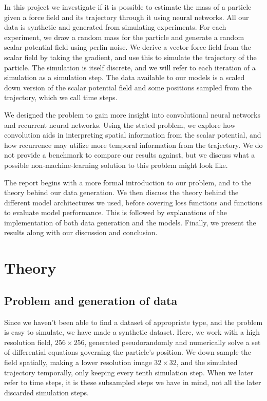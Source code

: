 \documentclass[a4paper]{article}
\begin{document}
In this project we investigate if it is possible to estimate the mass of a particle given a force field and its trajectory through it using neural networks.  All our data is synthetic and generated from simulating experiments.  For each experiment, we draw a random mass for the particle and generate a random scalar potential field using perlin noise. We derive a vector force field from the scalar field by taking the gradient, and use this to simulate the trajectory of the particle. The simulation is itself discrete, and we will refer to each iteration of a simulation as a simulation step. The data available to our models is a scaled down version of the scalar potential field and some positions sampled from the trajectory, which we call time steps.

We designed the problem to gain more insight into convolutional neural networks and recurrent neural networks. Using the stated problem, we explore how convolution aids in interpreting spatial information from the scalar potential, and how recurrence may utilize more temporal information from the trajectory. We do not provide a benchmark to compare our results against, but we discuss what a possible non-machine-learning solution to this problem might look like.

The report begins with a more formal introduction to our problem, and to the theory behind our data generation. We then discuss the theory behind the different model architectures we used, before covering loss functions and functions to evaluate model performance. This is followed by explanations of the implementation of both data generation and the models.  Finally, we present the results along with our discussion and conclusion.


\section{Theory}

\subsection{Problem and generation of data}
\label{subsec:theory-data-gen}
Since we haven't been able to find a dataset of appropriate type, and the problem is easy to simulate, we have made a synthetic dataset. Here, we work with a high resolution field, $256\times256$, generated pseudorandomly and numerically solve a set of differential equations governing the particle's position. We down-sample the field spatially, making a lower resolution image $32\times32$, and the simulated trajectory temporally, only keeping every tenth simulation step. When we later refer to time steps, it is these subsampled steps we have in mind, not all the later discarded simulation steps.
\end{document}
